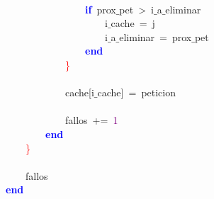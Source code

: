 \mbox{} \\
\mbox{}\ \ \ \ \ \ \ \ \ \ \ \ \ \ \ \ \textbf{\textcolor{Blue}{if}}\ prox$\_$pet\ \textcolor{BrickRed}{\textgreater{}}\ i$\_$a$\_$eliminar \\
\mbox{}\ \ \ \ \ \ \ \ \ \ \ \ \ \ \ \ \ \ \ \ i$\_$cache\ \textcolor{BrickRed}{=}\ j \\
\mbox{}\ \ \ \ \ \ \ \ \ \ \ \ \ \ \ \ \ \ \ \ i$\_$a$\_$eliminar\ \textcolor{BrickRed}{=}\ prox$\_$pet \\
\mbox{}\ \ \ \ \ \ \ \ \ \ \ \ \ \ \ \ \textbf{\textcolor{Blue}{end}} \\
\mbox{}\ \ \ \ \ \ \ \ \ \ \ \ \textcolor{Red}{\}} \\
\mbox{} \\
\mbox{}\ \ \ \ \ \ \ \ \ \ \ \ cache\textcolor{BrickRed}{[}i$\_$cache\textcolor{BrickRed}{]}\ \textcolor{BrickRed}{=}\ peticion \\
\mbox{} \\
\mbox{}\ \ \ \ \ \ \ \ \ \ \ \ fallos\ \textcolor{BrickRed}{+=}\ \textcolor{Purple}{1} \\
\mbox{}\ \ \ \ \ \ \ \ \textbf{\textcolor{Blue}{end}} \\
\mbox{}\ \ \ \ \textcolor{Red}{\}} \\
\mbox{} \\
\mbox{}\ \ \ \ fallos \\
\mbox{}\textbf{\textcolor{Blue}{end}}

